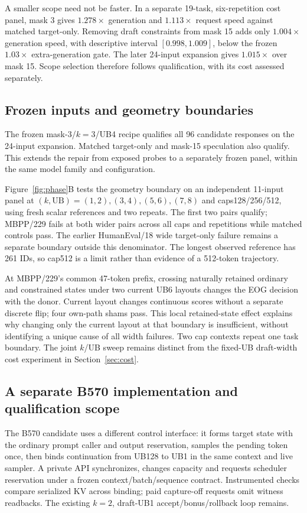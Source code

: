 A smaller scope need not be faster. In a separate 19-task, six-repetition cost panel, mask 3 gives $1.278\times$ generation and $1.113\times$ request speed against matched target-only. Removing draft constraints from mask 15 adds only $1.004\times$ generation speed, with descriptive interval $[0.998,1.009]$, below the frozen $1.03\times$ extra-generation gate. The later 24-input expansion gives $1.015\times$ over mask 15. Scope selection therefore follows qualification, with its cost assessed separately.

\subsection{Frozen inputs and geometry boundaries}
The frozen mask-3/$k=3$/UB4 recipe qualifies all 96 candidate responses on the 24-input expansion. Matched target-only and mask-15 speculation also qualify. This extends the repair from exposed probes to a separately frozen panel, within the same model family and configuration.

Figure~\ref{fig:phase}B tests the geometry boundary on an independent 11-input panel at $(k,\mathrm{UB})=(1,2),(3,4),(5,6),(7,8)$ and caps128/256/512, using fresh scalar references and two repeats. The first two pairs qualify; MBPP/229 fails at both wider pairs across all caps and repetitions while matched controls pass. The earlier HumanEval/18 wide target-only failure remains a separate boundary outside this denominator. The longest observed reference has 261 IDs, so cap512 is a limit rather than evidence of a 512-token trajectory.

At MBPP/229's common 47-token prefix, crossing naturally retained ordinary and constrained states under two current UB6 layouts changes the EOG decision with the donor. Current layout changes continuous scores without a separate discrete flip; four own-path shams pass. This local retained-state effect explains why changing only the current layout at that boundary is insufficient, without identifying a unique cause of all width failures. Two cap contexts repeat one task boundary. The joint $k$/UB sweep remains distinct from the fixed-UB draft-width cost experiment in Section~\ref{sec:cost}.

\subsection{A separate B570 implementation and qualification scope}
The B570 candidate uses a different control interface: it forms target state with the ordinary prompt caller and output reservation, samples the pending token once, then binds continuation from UB128 to UB1 in the same context and live sampler. A private API synchronizes, changes capacity and requests scheduler reservation under a frozen context/batch/sequence contract. Instrumented checks compare serialized KV across binding; paid capture-off requests omit witness readbacks. The existing $k=2$, draft-UB1 accept/bonus/rollback loop remains.

